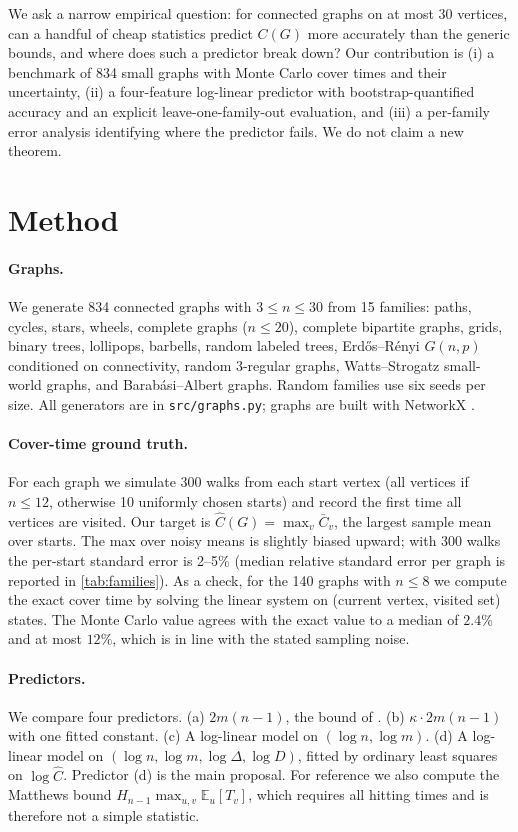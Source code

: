 \documentclass{article}
\begin{document}
We ask a narrow empirical question: for connected graphs on at most 30 vertices, can a handful of cheap statistics predict $C(G)$ more accurately than the generic bounds, and where does such a predictor break down? Our contribution is (i) a benchmark of 834 small graphs with Monte Carlo cover times and their uncertainty, (ii) a four-feature log-linear predictor with bootstrap-quantified accuracy and an explicit leave-one-family-out evaluation, and (iii) a per-family error analysis identifying where the predictor fails. We do not claim a new theorem.

\section{Method}
\label{sec:method}
\paragraph{Graphs.} We generate 834 connected graphs with $3\le n\le 30$ from 15 families: paths, cycles, stars, wheels, complete graphs ($n\le 20$), complete bipartite graphs, grids, binary trees, lollipops, barbells, random labeled trees, Erd\H{o}s--R\'enyi $G(n,p)$ conditioned on connectivity, random 3-regular graphs, Watts--Strogatz small-world graphs, and Barab\'asi--Albert graphs. Random families use six seeds per size. All generators are in \texttt{src/graphs.py}; graphs are built with NetworkX \citep{hagberg2008exploring}.

\paragraph{Cover-time ground truth.} For each graph we simulate $300$ walks from each start vertex (all vertices if $n\le 12$, otherwise 10 uniformly chosen starts) and record the first time all vertices are visited. Our target is $\hat C(G)=\max_v \bar C_v$, the largest sample mean over starts. The max over noisy means is slightly biased upward; with 300 walks the per-start standard error is 2--5\% (median relative standard error per graph is reported in \cref{tab:families}). As a check, for the 140 graphs with $n\le 8$ we compute the exact cover time by solving the linear system on (current vertex, visited set) states. The Monte Carlo value agrees with the exact value to a median of $2.4\%$ and at most $12\%$, which is in line with the stated sampling noise.

\paragraph{Predictors.} We compare four predictors. (a) $2m(n-1)$, the bound of \citet{aleliunas1979random}. (b) $\kappa\cdot 2m(n-1)$ with one fitted constant. (c) A log-linear model on $(\log n, \log m)$. (d) A log-linear model on $(\log n,\log m,\log\Delta,\log D)$, fitted by ordinary least squares on $\log \hat C$. Predictor (d) is the main proposal. For reference we also compute the Matthews bound \citep{matthews1988covering} $H_{n-1}\max_{u,v}\mathbb E_u[T_v]$, which requires all hitting times and is therefore not a simple statistic.
\end{document}
